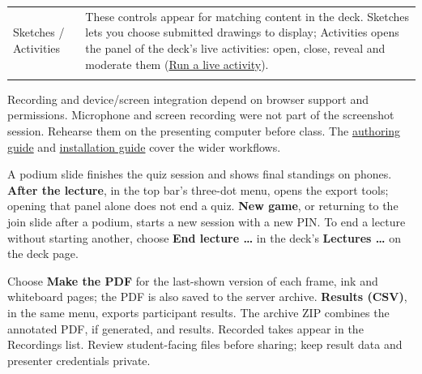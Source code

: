 \documentclass[a4paper,11pt]{article}
\begin{document}
{\begin{longtable}{>{\raggedright\arraybackslash}p{}>{\raggedright\arraybackslash}p{}}
Sketches /\allowbreak{} Activities & These controls appear for matching content in the deck.\allowbreak{} Sketches lets you choose submitted drawings to display; Activities opens the panel of the deck's live activities: open, close, reveal and moderate them (\hyperref[sec:run-a-live-activity]{Run a live activity}). \\ \addlinespace[3pt]
\end{longtable}}

Recording and device/\allowbreak{}screen integration depend on browser support and permissions.\allowbreak{} Microphone and screen recording were not part of the screenshot session.\allowbreak{} Rehearse them on the presenting computer before class.\allowbreak{} The \href{\manualdocroot authoring.md}{authoring guide} and \href{\manualdocroot installation.md}{installation guide} cover the wider workflows.\par

\label{sec:finish-the-session-and-export-the-material}
A podium slide finishes the quiz session and shows final standings on phones.\allowbreak{} \textbf{After the lecture}, in the top bar's three-\allowbreak{}dot menu, opens the export tools; opening that panel alone does not end a quiz.\allowbreak{} \textbf{New game}, or returning to the join slide after a podium, starts a new session with a new PIN.\allowbreak{} To end a lecture without starting another, choose \textbf{End lecture …} in the deck's \textbf{Lectures …} on the deck page.\par

Choose \textbf{Make the PDF} for the last-\allowbreak{}shown version of each frame, ink and whiteboard pages; the PDF is also saved to the server archive.\allowbreak{} \textbf{Results (CSV)}, in the same menu, exports participant results.\allowbreak{} The archive ZIP combines the annotated PDF, if generated, and results.\allowbreak{} Recorded takes appear in the Recordings list.\allowbreak{} Review student-\allowbreak{}facing files before sharing; keep result data and presenter credentials private.\par
\end{document}
